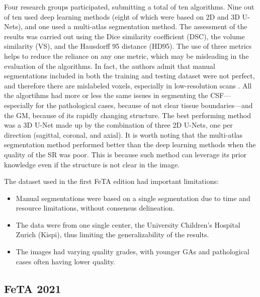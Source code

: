 Four research groups participated, submitting a total of ten algorithms. Nine out of ten used deep learning methods (eight of which were based on 2D and 3D U-Nets), and one used a multi-atlas segmentation method. The assessment of the results was carried out using the Dice similarity coefficient (DSC), the volume similarity (VS), and the Hausdorff 95 distance (HD95). The use of three metrics helps to reduce the reliance on any one metric, which may be misleading in the evaluation of the algorithms. In fact, the authors admit that manual segmentations included in both the training and testing dataset were not perfect, and therefore there are mislabeled voxels, especially in low-resolution scans \cite{FeTA2021_review}. All the algortihms had more or less the same issues in segmenting the CSF---especially for the pathological cases, because of not clear tissue boundaries---and the GM, because of its rapidly changing structure. The best performing method was a 3D U-Net made up by the combination of three 2D U-Nets, one per direction (sagittal, coronal, and axial). It is worth noting that the multi-atlas segmentation method performed better than the deep learning methods when the quality of the SR was poor. This is because such method can leverage its prior knowledge even if the structure is not clear in the image.

The dataset used in the first FeTA edition had important limitations:
\begin{itemize}
    \item Manual segmentations were based on a single segmentation due to time and resource limitations, without consensus delineation.
    \item The data were from one single center, the University Children's Hospital Zurich (Kispi), thus limiting the generalizability of the results.
    \item The images had varying quality grades, with younger GAs and pathological cases often having lower quality.
\end{itemize}

\subsection{FeTA 2021}

